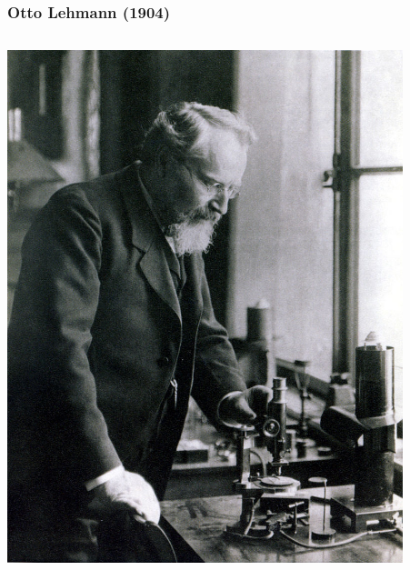 \documentclass[14pt]{beamer}
\begin{document}
\begin{frame}
\begin{center}
\begin{columns}
\begin{column}{0.5\textwidth}
			\end{column}
		\end{columns}
		\vspace*{1em}
	\end{center}
\end{frame}

\begin{frame}
	\frametitle{Otto Lehmann (1904)}
	\begin{center}
		\begin{columns}
			\begin{column}{0.5\textwidth}
		\includegraphics[width=0.9\textwidth]{otto_lehmann.jpg}
			\end{column}
			\begin{column}{0.5\textwidth}

\end{column}
\end{columns}
\end{center}
\end{frame}
\end{document}
